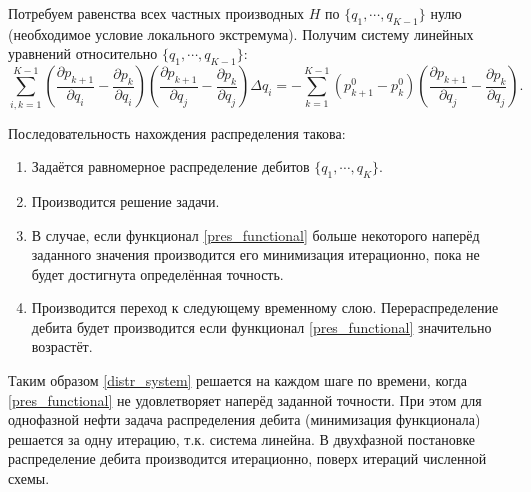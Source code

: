 	Потребуем равенства всех частных производных $H$ по $\{q_1, \cdots, q_{K-1}\}$ нулю (необходимое условие локального экстремума).	
	Получим систему линейных уравнений относительно $\{q_1, \cdots, q_{K-1}\}$:
\begin{equation}
	\label{distr_system}
	\sum\limits_{i, k = 1}^{K-1}\left(\frac{\partial p_{k+1}}{\partial q_i} - \frac{\partial p_k}{\partial q_i}\right)
	\left(\frac{\partial p_{k+1}}{\partial q_j} - \frac{\partial p_k}{\partial q_j}\right)\Delta q_i = 
	-\sum\limits_{k=1}^{K-1}\left(p_{k+1}^0 - p_k^0\right)\left(\frac{\partial p_{k+1}}{\partial q_j} - \frac{\partial p_{k}}{\partial q_j}\right).
\end{equation}

	Последовательность нахождения распределения такова: 
\begin{enumerate}
	\label{rate_order}
	\item{Задаётся равномерное распределение дебитов $\{q_1, \cdots, q_{K}\}$.}
	\item{Производится решение задачи.}
	\item{В случае, если функционал \eqref{pres_functional} больше некоторого наперёд заданного значения производится его минимизация итерационно, пока не будет достигнута определённая точность.}
	\item{Производится переход к следующему временному слою. Перераспределение дебита будет производится если функционал \eqref{pres_functional} значительно возрастёт.}
\end{enumerate}

	Таким образом \eqref{distr_system} решается на каждом шаге по времени, когда \eqref{pres_functional} не удовлетворяет наперёд заданной точности.
	При этом для однофазной нефти задача распределения дебита (минимизация функционала) решается за одну итерацию, т.к. система линейна.
	В двухфазной постановке распределение дебита производится итерационно, поверх итераций численной схемы.

